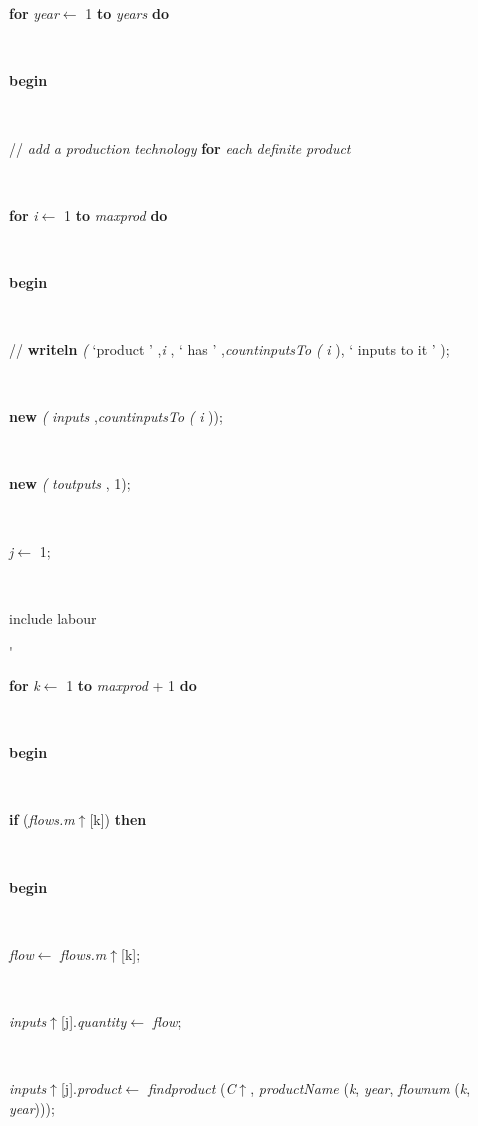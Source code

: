 \documentclass[10pt, a4paper]{article}
\begin{document}
\begin{tabbing}
\\
\\
\\
\\
\\
\\
\\
\+\parbox{14cm}{\textsf {\textbf {for } \textsf{\textit{year}$\leftarrow$ 1} \textbf{ to } \textsf{\textit{years}} \textbf{ do } }}\\
\<\parbox{14cm}{\textsf{\textbf{begin} }}\\
\parbox{14cm}{\textsf{// \textit{add}  \textit{a}  \textit{production}  \textit{technology}  \textbf{for}  \textit{each}  \textit{definite}  \textit{product} }}\\
\+\parbox{14cm}{\textsf {\textbf {for } \textsf{\textit{i}$\leftarrow$ 1} \textbf{ to } \textsf{\textit{maxprod}} \textbf{ do } }}\\
\<\parbox{14cm}{\textsf{\textbf{begin} }}\\
\parbox{14cm}{\textsf{// \textbf{writeln} \textit{(} \textrm{\textup { `product ' } },\textit{i} ,\textrm{\textup { ` has ' } },\textit{countinputsTo} \textit{(} \textit{i} ),\textrm{\textup { ` inputs to it ' } });}}\\
\parbox{14cm}{\textsf{\textbf{new} \textit{(} \textit{inputs} ,\textit{countinputsTo} \textit{(} \textit{i} ));}}\\
\parbox{14cm}{\textsf{\textbf{new} \textit{(} \textit{toutputs} , 1);}}\\
\parbox{14cm}{\textsf{\textit{j}$\leftarrow$ 1}; }\\
\+\<\<\<\parbox{3.5cm}{\scriptsize{include labour}}\'\>\>\>\parbox{14cm}{\textsf {\textbf {for } \textsf{\textit{k}$\leftarrow$ 1} \textbf{ to } \textsf{\textit{maxprod} + 1} \textbf{ do } }}\\
\<\parbox{14cm}{\textsf{\textbf{begin} }}\\
\+\parbox{14cm}{\textsf {\textbf {if } \textsf{(\textit{flows.m}$\uparrow$\textit{}[k])} \textbf{ then } }}\\
\<\parbox{14cm}{\textsf{\textbf{begin} }}\\
\parbox{14cm}{\textsf{\textit{flow}$\leftarrow$ \textit{flows.m}$\uparrow$\textit{}[k]}; }\\
\parbox{14cm}{\textsf{\textit{inputs}$\uparrow$\textit{}[j].\textit{quantity}$\leftarrow$ \textit{flow}}; }\\
\parbox{14cm}{\textsf{\textit{inputs}$\uparrow$\textit{}[j].\textit{product}$\leftarrow$ \textit{findproduct} (\textit{C}$\uparrow$\textit{}, \textit{productName} (\textit{k}, \textit{year}, \textit{flownum} (\textit{k}, \textit{year})))}; }\\

\end{tabbing}
\end{document}
